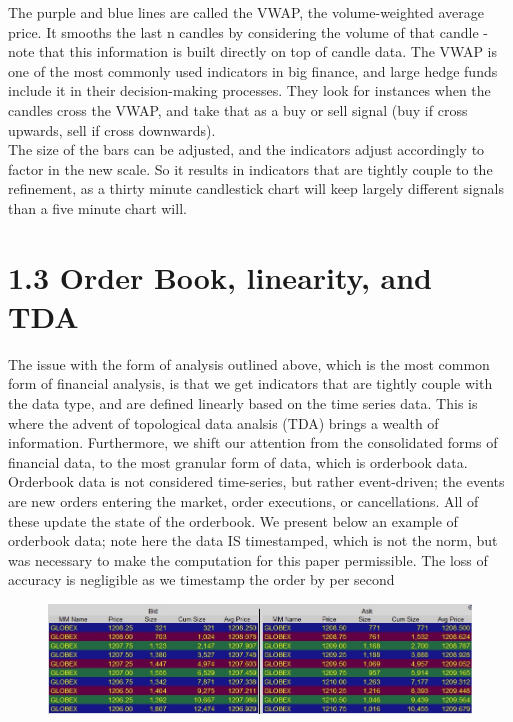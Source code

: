 \documentclass[14pt]{extarticle}
\begin{document}
The purple and blue lines are called the VWAP, the volume-weighted average price. It smooths the last n candles by considering the volume of that candle - note that this information is built directly on top of candle data. The VWAP is one of the most commonly used indicators in big finance, and large hedge funds include it in their decision-making processes. They look for instances when the candles cross the VWAP, and take that as a buy or sell signal (buy if cross upwards, sell if cross downwards).\\
The size of the bars can be adjusted, and the indicators adjust accordingly to factor in the new scale. So it results in indicators that are tightly couple to the refinement, as a thirty minute candlestick chart will keep largely different signals than a five minute chart will.

\section*{1.3 Order Book, linearity, and TDA}

The issue with the form of analysis outlined above, which is the most common form of financial analysis, is that we get indicators that are tightly couple with the data type, and are defined linearly based on the time series data. This is where the advent of topological data analsis (TDA) brings a wealth of information. Furthermore, we shift our attention from the consolidated forms of financial data, to the most granular form of data, which is orderbook data. Orderbook data is not considered time-series, but rather event-driven; the events are new orders entering the market, order executions, or cancellations. All of these update the state of the orderbook. We present below an example of orderbook data; note here the data IS timestamped, which is not the norm, but was necessary to make the computation for this paper permissible. The loss of accuracy is negligible as we timestamp the order by per second
\begin{figure}[h]
\centering
\includegraphics[scale=0.7]{market_depth}
\end{figure}
\end{document}
